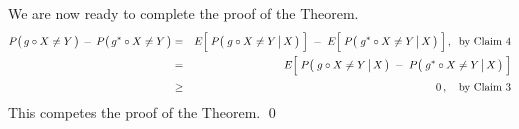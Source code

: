 \vskip 0.8cm
\noindent
We are now ready to complete the proof of the Theorem.
\begin{eqnarray*}
P\!\left(\,g\overset{{\color{white}.}}{\circ}X \neq Y\,\right) \,-\, P\!\left(\,g^{*}\overset{{\color{white}.}}{\circ}X \neq Y\,\right)
&=&
	E\!\left[\;\overset{{\color{white}.}}{P}\!\left(\,\left. g \overset{{\color{white}.}}{\circ} X \neq Y \,\right\vert X \,\right)\;\right]
	\; - \;
	E\!\left[\;\overset{{\color{white}.}}{P}\!\left(\,\left. g^{*} \overset{{\color{white}.}}{\circ} X \neq Y \,\right\vert X \,\right)\;\right],
	\;\;\textnormal{by Claim 4}
\\
&=&
	E\!\left[\;
		\overset{{\color{white}.}}{P}\!\left(\,\left. g \overset{{\color{white}.}}{\circ} X \neq Y \,\right\vert X \,\right)
		\; - \;
		\overset{{\color{white}.}}{P}\!\left(\,\left. g^{*} \overset{{\color{white}.}}{\circ} X \neq Y \,\right\vert X \,\right)
	\;\right]
\\
&\overset{{\color{white}.}}{\geq}&
	0\,,
	\quad
	\textnormal{by Claim 3}
\end{eqnarray*}
This competes the proof of the Theorem.
\qed



\renewcommand{\theenumi}{\roman{enumi}}
\renewcommand{\labelenumi}{\textnormal{(\theenumi)}$\;\;$}

